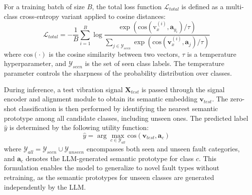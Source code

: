 For a training batch of size $B$, the total loss function $\mathcal{L}_{total}$ is defined as a multi-class cross-entropy variant applied to cosine distances:
\begin{equation}
\mathcal{L}_{total} = -\frac{1}{B} \sum_{i=1}^{B} \log \frac{\exp(\text{cos}(\text{v}_x^{(i)}, \mathbf{a}_{y_i}) / \tau)}{\sum_{j \in \mathcal{Y}_{seen}} \exp(\text{cos}(\mathbf{v}_x^{(i)}, \mathbf{a}_j) / \tau)}
\end{equation}
where $\text{cos}(\cdot)$ is the cosine similarity between two vectors, $\tau$ is a temperature hyperparameter, and $\mathcal{Y}_{seen}$ is the set of seen class labels. The temperature parameter controls the sharpness of the probability distribution over classes.

During inference, a test vibration signal $\mathbf{X}_{test}$ is passed through the signal encoder and alignment module to obtain its semantic embedding $\mathbf{v}_{test}$. The zero-shot classification is then performed by identifying the nearest semantic prototype among all candidate classes, including unseen ones. The predicted label $\hat{y}$ is determined by the following utility function:
\begin{equation}
\hat{y} = \arg\max_{c \in \mathcal{Y}_{all}} \text{cos}(\mathbf{v}_{test}, \mathbf{a}_c)
\end{equation}
where $\mathcal{Y}_{all} = \mathcal{Y}_{seen} \cup \mathcal{Y}_{unseen}$ encompasses both seen and unseen fault categories, and $\mathbf{a}_c$ denotes the LLM-generated semantic prototype for class $c$. This formulation enables the model to generalize to novel fault types without retraining, as the semantic prototypes for unseen classes are generated independently by the LLM.

